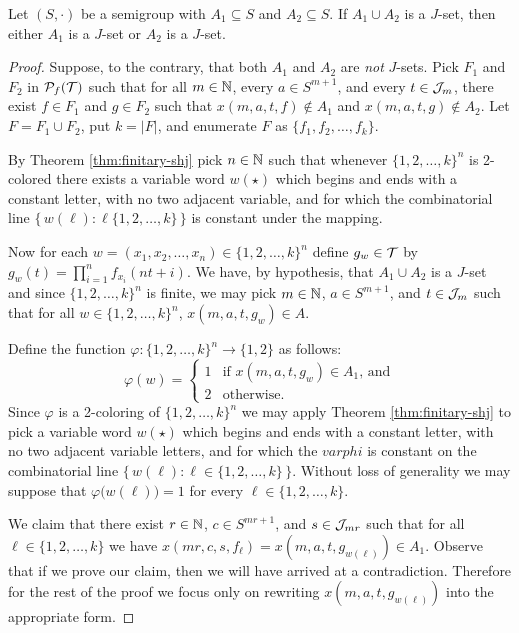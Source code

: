 \begin{lem}
  \label{lem:pr-jsets}
  Let $(S, \cdot)$ be a semigroup with $A_1 \subseteq S$ and $A_2 \subseteq S$.
  If $A_1 \cup A_2$ is a $J$-set, then either $A_1$ is a $J$-set or $A_2$ is a $J$-set.
\end{lem}
\begin{proof}
  Suppose, to the contrary, that both $A_1$ and $A_2$ are \emph{not} $J$-sets.
  Pick $F_1$ and $F_2$ in $\mathcal{P}_f(\mathcal{T})$ such that for all $m \in \mathbb{N}$, every $a \in S^{m+1}$, and every $t \in \mathcal{J}_m$, there exist $f \in F_1$ and $g \in F_2$ such that $x(m, a, t, f) \not\in A_1$ and $x(m, a, t, g) \not\in A_2$.
  Let $F = F_1 \cup F_2$, put $k = |F|$, and enumerate $F$ as $\{f_1, f_2, \ldots, f_k\}$.

  By Theorem \ref{thm:finitary-shj} pick $n \in \mathbb{N}$ such that whenever $\{1, 2, \ldots, k\}^n$ is 2-colored there exists a variable word $w(\star)$ which begins and ends with a constant letter, with no two adjacent variable, and for which the combinatorial line $\bigl\{\, w(\ell) : \ell \{1, 2, \ldots, k\} \,\bigr\}$ is constant under the mapping. 

  Now for each $w = (x_1, x_2, \ldots, x_n) \in \{1, 2, \ldots, k\}^n$ define $g_w \in \mathcal{T}$ by $g_w(t) = \prod_{i=1}^n f_{x_i}(nt + i)$.
  We have, by hypothesis, that $A_1 \cup A_2$ is a $J$-set and since $\{1, 2, \ldots, k\}^n$ is finite, we may pick $m \in \mathbb{N}$, $a \in S^{m+1}$, and $t \in \mathcal{J}_m$ such that for all $w \in \{1, 2, \ldots, k\}^n$, $x(m, a, t, g_w) \in A$.

  Define the function $\varphi \colon \{1, 2, \ldots, k\}^n \to \{1, 2\}$ as follows:
  \[
    \varphi(w) = 
    \begin{cases}
      1 & \mbox{if $x(m, a, t, g_w) \in A_1$, and} \\
      2 & \mbox{otherwise.}
    \end{cases}
  \]
  Since $\varphi$ is a 2-coloring of $\{1, 2, \ldots, k\}^n$ we may apply Theorem \ref{thm:finitary-shj} to pick a variable word $w(\star)$ which begins and ends with a constant letter, with no two adjacent variable letters, and for which the $varphi$ is constant on the combinatorial line $\bigl\{\, w(\ell) : \ell \in \{1, 2, \ldots, k\} \,\bigr\}$. 
  Without loss of generality we may suppose that $\varphi \bigl( w(\ell) \bigr) = 1$ for every $\ell \in \{1, 2, \ldots, k\}$.

  We claim that there exist $r \in \mathbb{N}$, $c \in S^{mr+1}$, and $s \in \mathcal{J}_{mr}$ such that for all $\ell \in \{1, 2, \ldots, k\}$ we have $x(mr, c, s, f_\ell) = x(m, a, t, g_{w(\ell)}) \in A_1$. 
  Observe that if we prove our claim, then we will have arrived at a contradiction. 
  Therefore for the rest of the proof we focus only on rewriting $x(m, a, t, g_{w(\ell)})$ into the appropriate form.


\end{proof}
